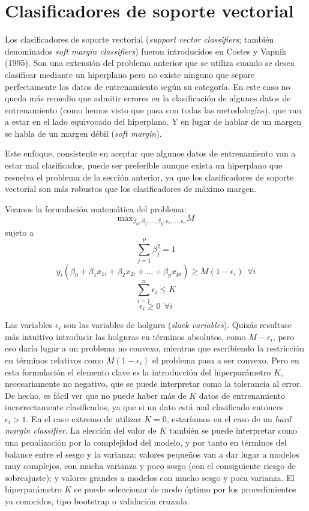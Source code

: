 \documentclass[
]{book}
\theoremstyle{break}
\theoremstyle{definition}
\theoremstyle{definition}
\theoremstyle{definition}
\theoremstyle{definition}
\theoremstyle{remark}
\begin{document}
\hypertarget{clasificadores-de-soporte-vectorial}{%
\section{Clasificadores de soporte vectorial}\label{clasificadores-de-soporte-vectorial}}

Los clasificadores de soporte vectorial (\emph{support vector classifiers}; también denominados \emph{soft margin classifiers}) fueron introducidos en Costes y Vapnik (1995). Son una extensión del problema anterior que se utiliza cuando se desea clasificar mediante un hiperplano pero no existe ninguno que separe perfectamente los datos de entrenamiento según su categoría. En este caso no queda más remedio que admitir errores en la clasificación de algunos datos de entrenamiento (como hemos visto que pasa con todas las metodologías), que van a estar en el lado equivocado del hiperplano. Y en lugar de hablar de un margen se habla de un margen débil (\emph{soft margin}).

Este enfoque, consistente en aceptar que algunos datos de entrenamiento van a estar mal clasificados, puede ser preferible aunque exista un hiperplano que resuelva el problema de la sección anterior, ya que los clasificadores de soporte vectorial son más robustos que los clasificadores de máximo margen.

Veamos la formulación matemática del problema:
\[\mbox{max}_{\beta_0, \beta_1,\ldots, \beta_p, \epsilon_1,\ldots, \epsilon_n} M\]
sujeto a
\[\sum_{j=1}^p \beta_j^2 = 1\]
\[ y_i(\beta_0 + \beta_1 x_{1i} + \beta_2 x_{2i} + \ldots + \beta_p x_{pi}) \ge M(1 - \epsilon_i) \ \ \forall i\]
\[\sum_{i=1}^n \epsilon_i \le K\]
\[\epsilon_i \ge 0 \ \ \forall i\]

Las variables \(\epsilon_i\) son las variables de holgura (\emph{slack variables}). Quizás resultase más intuitivo introducir las holguras en términos absolutos, como \(M -\epsilon_i\), pero eso daría lugar a un problema no convexo, mientras que escribiendo la restricción en términos relativos como \(M(1 - \epsilon_i)\) el problema pasa a ser convexo. Pero en esta formulación el elemento clave es la introducción del hiperparámetro \(K\), necesariamente no negativo, que se puede interpretar como la tolerancia al error. De hecho, es fácil ver que no puede haber más de \(K\) datos de entrenamiento incorrectamente clasificados, ya que si un dato está mal clasificado entonces \(\epsilon_i > 1\). En el caso extremo de utilizar \(K = 0\), estaríamos en el caso de un \emph{hard margin classifier}. La elección del valor de \(K\) también se puede interpretar como una penalización por la complejidad del modelo, y por tanto en términos del balance entre el sesgo y la varianza: valores pequeños van a dar lugar a modelos muy complejos, con mucha varianza y poco sesgo (con el consiguiente riesgo de sobreajuste); y valores grandes a modelos con mucho sesgo y poca varianza. El hiperparámetro \(K\) se puede seleccionar de modo óptimo por los procedimientos ya conocidos, tipo bootstrap o validación cruzada.
\end{document}
